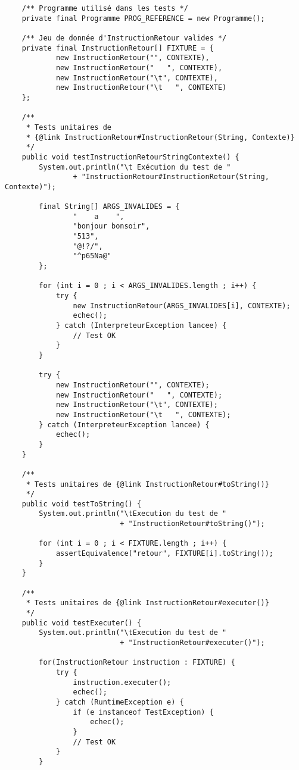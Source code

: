 \begin{enum}
\begin{verbatim}
    /** Programme utilisé dans les tests */
    private final Programme PROG_REFERENCE = new Programme();
    
    /** Jeu de donnée d'InstructionRetour valides */
    private final InstructionRetour[] FIXTURE = {
            new InstructionRetour("", CONTEXTE),
            new InstructionRetour("   ", CONTEXTE),
            new InstructionRetour("\t", CONTEXTE),
            new InstructionRetour("\t   ", CONTEXTE)
    };
    
    /**
     * Tests unitaires de
     * {@link InstructionRetour#InstructionRetour(String, Contexte)}
     */
    public void testInstructionRetourStringContexte() {
        System.out.println("\t Exécution du test de "
                + "InstructionRetour#InstructionRetour(String, Contexte)");
        
        final String[] ARGS_INVALIDES = {
                "    a    ",
                "bonjour bonsoir",
                "513",
                "@!?/",
                "^p65Na@"
        };
        
        for (int i = 0 ; i < ARGS_INVALIDES.length ; i++) {
            try {
                new InstructionRetour(ARGS_INVALIDES[i], CONTEXTE);
                echec();
            } catch (InterpreteurException lancee) {
                // Test OK
            }
        }
        
        try {
            new InstructionRetour("", CONTEXTE);
            new InstructionRetour("   ", CONTEXTE);
            new InstructionRetour("\t", CONTEXTE);
            new InstructionRetour("\t   ", CONTEXTE);
        } catch (InterpreteurException lancee) {
            echec();
        }
    }
    
    /**
     * Tests unitaires de {@link InstructionRetour#toString()}
     */
    public void testToString() {
        System.out.println("\tExecution du test de "
                           + "InstructionRetour#toString()");
        
        for (int i = 0 ; i < FIXTURE.length ; i++) {
            assertEquivalence("retour", FIXTURE[i].toString());
        }
    }
    
    /**
     * Tests unitaires de {@link InstructionRetour#executer()}
     */
    public void testExecuter() {
        System.out.println("\tExecution du test de "
                           + "InstructionRetour#executer()");
        
        for(InstructionRetour instruction : FIXTURE) {
            try {
                instruction.executer();
                echec();
            } catch (RuntimeException e) {
                if (e instanceof TestException) {
                    echec();
                }
                // Test OK
            }
        }
        

\end{verbatim}
\end{enum}
